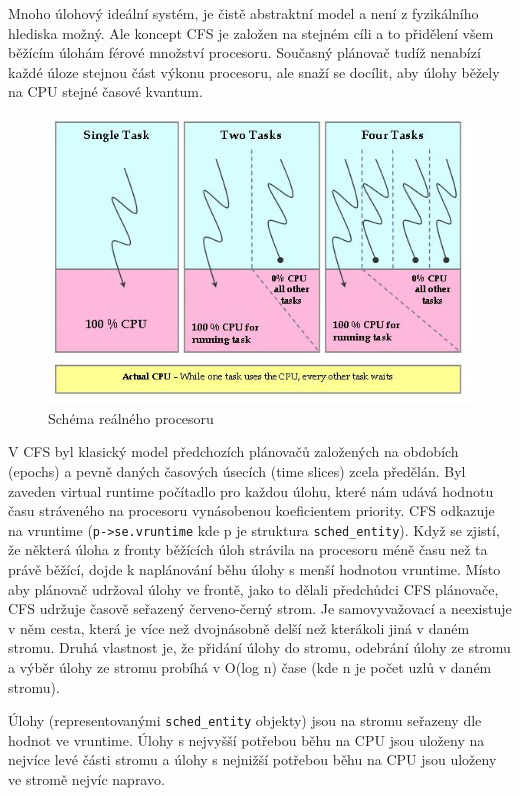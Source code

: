 \documentclass[
  master=true,
  font=sans,
  printversion=false,
  joinlists=true,
  figures=true,
  tables=true,
  sourcecodes=false,
  theorems=false,
  bibencoding=utf8,
  language=czech,
  encoding=utf8,
  field=ainfk,
  biblatex,
  glossaries,
  index
]{kidiplom}
\begin{document}
Mnoho úlohový ideální systém, je čistě abstraktní model a není z fyzikálního hlediska možný. Ale koncept CFS je založen na stejném cíli a to přidělení všem běžícím úlohám férové množství procesoru. Současný plánovač tudíž nenabízí každé úloze stejnou část výkonu procesoru, ale snaží se docílit, aby úlohy běžely na CPU stejné časové kvantum. 

\begin{figure}[ht]
\includegraphics[scale=0.85]{obrazky/realProcessor.jpg}
\caption{Schéma reálného procesoru}
\label{realny procesor}
\end{figure}


V CFS byl klasický model předchozích plánovačů založených na obdobích (epochs) a pevně daných časových úsecích (time slices) zcela předělán. Byl zaveden virtual runtime počítadlo pro každou úlohu, které nám udává hodnotu času stráveného na procesoru vynásobenou koeficientem priority. CFS odkazuje na vruntime (\verb#p->se.vruntime# kde p je struktura \verb#sched_entity#).  
Když se zjistí, že některá úloha z fronty běžících úloh strávila na procesoru méně času než ta právě běžící, dojde k naplánování běhu úlohy s menší hodnotou vruntime. Místo aby plánovač udržoval úlohy ve frontě, jako to dělali předchůdci CFS plánovače, CFS udržuje časově seřazený červeno-černý strom. Je samovyvažovací a neexistuje v něm cesta, která je více než dvojnásobně delší než kterákoli jiná v daném stromu. Druhá vlastnost je, že přidání úlohy do stromu, odebrání úlohy ze stromu a výběr úlohy ze stromu probíhá v O(log n) čase (kde n je počet uzlů v daném stromu).

Úlohy (representovanými \verb#sched_entity# objekty) jsou na stromu seřazeny dle hodnot ve vruntime. Úlohy s nejvyšší potřebou běhu na CPU jsou uloženy na nejvíce levé části stromu a úlohy s nejnižší potřebou běhu na CPU jsou uloženy ve stromě nejvíc napravo.
\end{document}
